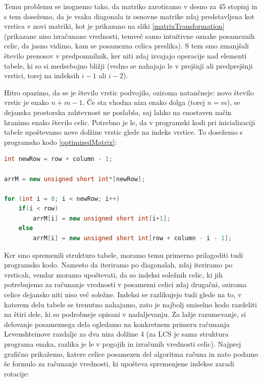 \documentclass[a4paper,12pt,openright]{book}
\begin{document}
Temu problemu se izognemo tako, da matriko zarotiramo v desno za 45 stopinj in s tem dosežemo, da je vsaka diagonala iz osnovne matrike zdaj predstavljena kot vrstica v novi matriki, kot je prikazano na sliki \ref{matrixTransformation} (prikazane niso izračunane vrednosti, temveč samo intuitivne oznake posameznih celic, da jasno vidimo, kam se posamezna celica preslika). S tem smo zmanjšali število prenosov v predpomnilnik, ker niti zdaj izvajajo operacije nad elementi tabele, ki so si medsebojno bližji (vedno se nahajajo le v prejšnji ali predprejšnji vrstici, torej na indeksih $i-1$ ali $i-2$). 

Hitro opazimo, da se je število vrstic podvojilo, oziroma natančneje: novo število vrstic je enako $n+m-1$. Če sta vhodna niza enako dolga (torej $n = m$), se dejanska prostorska zahtevnost ne poslabša, saj lahko na enostaven način hranimo enako število celic. Potrebno je le, da v programski kodi pri inicializaciji tabele upoštevamo nove dolžine vrstic glede na indeks vrstice. To dosežemo s programsko kodo \ref{optimizedMatrix}: 

\bigskip
\bigskip

\begin{lstlisting}[language=C++, caption={Inicializacija optimizirane tabele.}, captionpos=b, label=optimizedMatrix]
int newRow = row + column - 1;

arrM = new unsigned short int*[newRow];

for (int i = 0; i < newRow; i++) 
    if(i < row)
        arrM[i] = new unsigned short int[i+1];
    else
        arrM[i] = new unsigned short int[row + column - i - 1];
\end{lstlisting}

\bigskip
\bigskip

Ker smo spremenili strukturo tabele, moramo temu primerno prilagoditi tudi programsko kodo. Namesto da iteriramo po diagonalah, zdaj iteriramo po vrsticah, vendar moramo upoštevati, da so indeksi soležnih celic, ki jih potrebujemo za računanje vrednosti v posamezni celici zdaj drugačni, oziroma celice dejansko niti niso več soležne. Indeksi se razlikujejo tudi glede na to, v katerem delu tabele se trenutno nahajamo, zato je najbolj smiselno kodo razdeliti na štiri dele, ki so podrobneje opisani v nadaljevanju. Za lažje razumevanje, si delovanje posameznega dela ogledamo na konkretnem primeru računanja Levenshteinove razdalje za dva niza dolžine 4 (za LCS je sama struktura programa enaka, razlika je le v pogojih in izračunih vrednosti celic). Najprej grafično prikažemo, katere celice posamezen del algoritma računa in nato podamo še formulo za računanje vrednosti, ki upošteva spremenjene indekse zaradi rotacije: 
\end{document}
